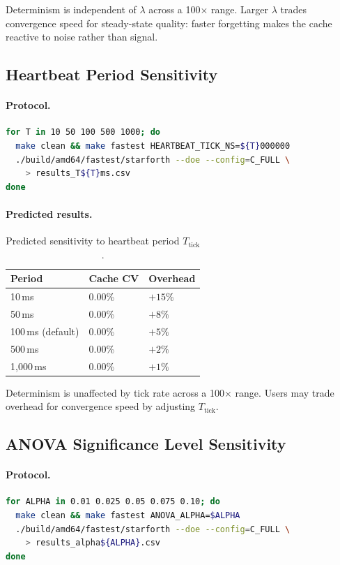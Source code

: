 Determinism is independent of $\lambda$ across a 100$\times$ range. Larger
$\lambda$ trades convergence speed for steady-state quality: faster forgetting
makes the cache reactive to noise rather than signal.

\subsection{Heartbeat Period Sensitivity}

\paragraph{Protocol.}
\begin{lstlisting}[language=bash]
for T in 10 50 100 500 1000; do
  make clean && make fastest HEARTBEAT_TICK_NS=${T}000000
  ./build/amd64/fastest/starforth --doe --config=C_FULL \
    > results_T${T}ms.csv
done
\end{lstlisting}

\paragraph{Predicted results.}
\begin{table}[h]
\centering
\caption{Predicted sensitivity to heartbeat period $T_{\text{tick}}$.}
\begin{tabular}{lll}
\toprule
\textbf{Period} & \textbf{Cache CV} & \textbf{Overhead} \\
\midrule
10\,ms & 0.00\% & $+15\%$ \\
50\,ms & 0.00\% & $+8\%$ \\
100\,ms (default) & 0.00\% & $+5\%$ \\
500\,ms & 0.00\% & $+2\%$ \\
1{,}000\,ms & 0.00\% & $+1\%$ \\
\bottomrule
\end{tabular}
\end{table}

Determinism is unaffected by tick rate across a 100$\times$ range. Users may
trade overhead for convergence speed by adjusting $T_{\text{tick}}$.

\subsection{ANOVA Significance Level Sensitivity}

\paragraph{Protocol.}
\begin{lstlisting}[language=bash]
for ALPHA in 0.01 0.025 0.05 0.075 0.10; do
  make clean && make fastest ANOVA_ALPHA=$ALPHA
  ./build/amd64/fastest/starforth --doe --config=C_FULL \
    > results_alpha${ALPHA}.csv
done
\end{lstlisting}

